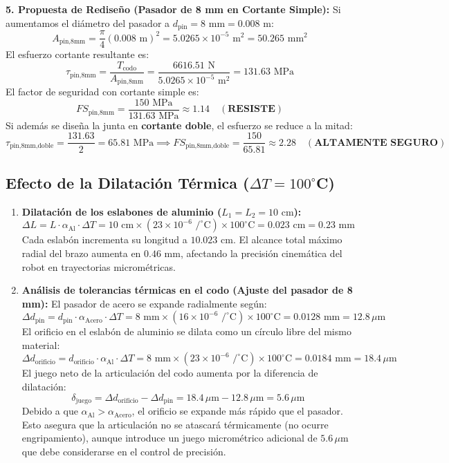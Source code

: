 \documentclass[11pt,a4paper]{article}
\begin{document}
\textbf{5. Propuesta de Rediseño (Pasador de 8 mm en Cortante Simple):}
Si aumentamos el diámetro del pasador a $d_{\text{pin}} = 8\text{ mm} = 0.008\text{ m}$:
$$A_{\text{pin,8mm}} = \frac{\pi}{4}(0.008\text{ m})^2 = 5.0265 \times 10^{-5}\text{ m}^2 = 50.265\text{ mm}^2$$
El esfuerzo cortante resultante es:
$$\tau_{\text{pin,8mm}} = \frac{T_{\text{codo}}}{A_{\text{pin,8mm}}} = \frac{6616.51\text{ N}}{5.0265 \times 10^{-5}\text{ m}^2} = 131.63\text{ MPa}$$
El factor de seguridad con cortante simple es:
$$FS_{\text{pin,8mm}} = \frac{150\text{ MPa}}{131.63\text{ MPa}} \approx 1.14 \quad (\textbf{RESISTE})$$
Si además se diseña la junta en \textbf{cortante doble}, el esfuerzo se reduce a la mitad:
$$\tau_{\text{pin,8mm,doble}} = \frac{131.63}{2} = 65.81\text{ MPa} \implies FS_{\text{pin,8mm,doble}} = \frac{150}{65.81} \approx 2.28 \quad (\textbf{ALTAMENTE SEGURO})$$

\subsection{Efecto de la Dilatación Térmica ($\Delta T = 100^\circ$C)}
\begin{enumerate}
    \item \textbf{Dilatación de los eslabones de aluminio ($L_1 = L_2 = 10\text{ cm}$):}
    $$\Delta L = L \cdot \alpha_{\text{Al}} \cdot \Delta T = 10\text{ cm} \times (23 \times 10^{-6}\text{ /}^\circ\text{C}) \times 100^\circ\text{C} = 0.023\text{ cm} = 0.23\text{ mm}$$
    Cada eslabón incrementa su longitud a $10.023\text{ cm}$. El alcance total máximo radial del brazo aumenta en $0.46\text{ mm}$, afectando la precisión cinemática del robot en trayectorias micrométricas.
    \item \textbf{Análisis de tolerancias térmicas en el codo (Ajuste del pasador de 8 mm):}
    El pasador de acero se expande radialmente según:
    $$\Delta d_{\text{pin}} = d_{\text{pin}} \cdot \alpha_{\text{Acero}} \cdot \Delta T = 8\text{ mm} \times (16 \times 10^{-6}\text{ /}^\circ\text{C}) \times 100^\circ\text{C} = 0.0128\text{ mm} = 12.8\,\mu\text{m}$$
    El orificio en el eslabón de aluminio se dilata como un círculo libre del mismo material:
    $$\Delta d_{\text{orificio}} = d_{\text{orificio}} \cdot \alpha_{\text{Al}} \cdot \Delta T = 8\text{ mm} \times (23 \times 10^{-6}\text{ /}^\circ\text{C}) \times 100^\circ\text{C} = 0.0184\text{ mm} = 18.4\,\mu\text{m}$$
    El juego neto de la articulación del codo aumenta por la diferencia de dilatación:
    $$\delta_{\text{juego}} = \Delta d_{\text{orificio}} - \Delta d_{\text{pin}} = 18.4\,\mu\text{m} - 12.8\,\mu\text{m} = 5.6\,\mu\text{m}$$
    Debido a que $\alpha_{\text{Al}} > \alpha_{\text{Acero}}$, el orificio se expande más rápido que el pasador. Esto asegura que la articulación no se atascará térmicamente (no ocurre engripamiento), aunque introduce un juego micrométrico adicional de $5.6\,\mu\text{m}$ que debe considerarse en el control de precisión.
\end{enumerate}
\end{document}
